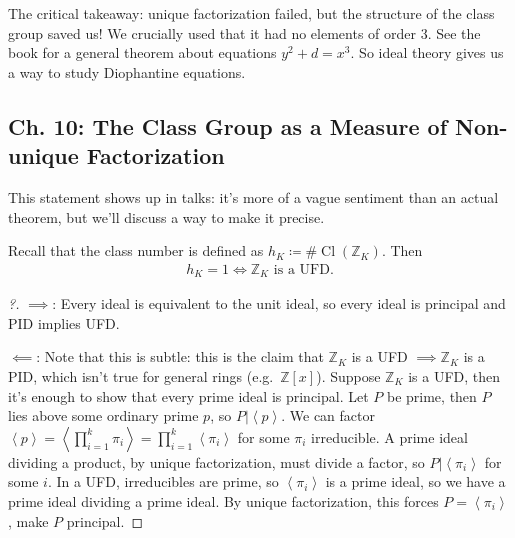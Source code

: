 \begin{remark}

The critical takeaway: unique factorization failed, but the structure of
the class group saved us! We crucially used that it had no elements of
order 3. See the book for a general theorem about equations
\(y^2 + d = x^3\). So ideal theory gives us a way to study Diophantine
equations.

\end{remark}

\hypertarget{ch.-10-the-class-group-as-a-measure-of-non-unique-factorization}{%
\subsection{Ch. 10: The Class Group as a Measure of Non-unique
Factorization}\label{ch.-10-the-class-group-as-a-measure-of-non-unique-factorization}}

\begin{remark}

This statement shows up in talks: it's more of a vague sentiment than an
actual theorem, but we'll discuss a way to make it precise.

\end{remark}

\begin{theorem}[?]

Recall that the class number is defined as
\(h_K \coloneqq\# \operatorname{Cl}({\mathbb{Z}}_K)\). Then
\begin{align*}
h_K = 1 \iff {\mathbb{Z}}_K \text{ is a UFD}
.\end{align*}

\end{theorem}

\begin{proof}[?]

\(\implies\): Every ideal is equivalent to the unit ideal, so every
ideal is principal and PID implies UFD.

\(\impliedby\): Note that this is subtle: this is the claim that
\({\mathbb{Z}}_K\) is a UFD \(\implies {\mathbb{Z}}_K\) is a PID, which
isn't true for general rings (e.g.~\({\mathbb{Z}}[x]\)). Suppose
\({\mathbb{Z}}_K\) is a UFD, then it's enough to show that every prime
ideal is principal. Let \(P\) be prime, then \(P\) lies above some
ordinary prime \(p\), so
\(P \mathrel{\Big|}\left\langle{ p }\right\rangle\). We can factor
\(\left\langle{ p }\right\rangle= \left\langle{ \prod_{i=1}^k \pi_i }\right\rangle = \prod_{i=1}^k \left\langle{ \pi_i }\right\rangle\)
for some \(\pi_i\) irreducible. A prime ideal dividing a product, by
unique factorization, must divide a factor, so
\(P \mathrel{\Big|}\left\langle{ \pi_i }\right\rangle\) for some \(i\).
In a UFD, irreducibles are prime, so
\(\left\langle{ \pi_i }\right\rangle\) is a prime ideal, so we have a
prime ideal dividing a prime ideal. By unique factorization, this forces
\(P = \left\langle{ \pi_i }\right\rangle\), make \(P\) principal.

\end{proof}


